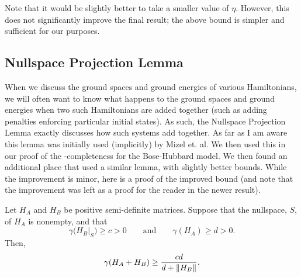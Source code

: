 \documentclass[../thesis-main/thesis-main]{subfiles}
\begin{document}
Note that it would be slightly better to take a smaller value of $\eta$.  However, this does not significantly improve the final result; the above bound is simpler and sufficient for our purposes.

\subsection{Nullspace Projection Lemma}

When we discuss the ground spaces and ground energies of various Hamiltonians, we will often want to know what happens to the ground spaces and ground energies when two such Hamiltonians are added together (such as adding penalties enforcing particular initial states).  As such, the Nullspace Projection Lemma exactly discusses how such systems add together.  As far as I am aware this lemma was initially used (implicitly) by Mizel et. al.  
We then used this in our proof of the \QMA-completeness for the Bose-Hubbard model.  We then found an additional place that used a similar lemma, with slightly better bounds.  While the improvement is minor, here is a proof of the improved bound (and note that the improvement was left as a proof for the reader in the newer result).
\begin{lemma}
Let $H_A$ and $H_B$ be positive semi-definite matrices.  Suppose that the nullspace, $S$, of $H_A$ is nonempty, and that 
\begin{equation}
  \gamma\big(H_B|_S\big) \geq c > 0 \qquad \text{and} \qquad \gamma(H_A) \geq d > 0.
\end{equation}
Then,
\begin{equation}
  \gamma(H_A + H_B) \geq \frac{c d}{d + \|{H_B}\|} .
\end{equation}
\label{lem:NPL}
\end{lemma}
\end{document}

